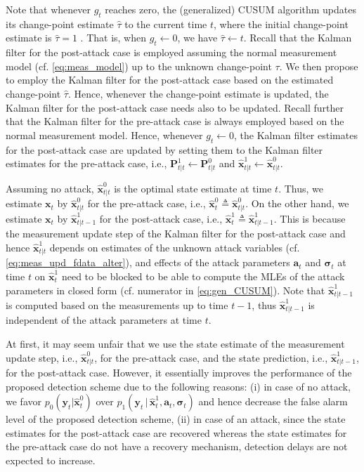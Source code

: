 \documentclass[onecolumn]{IEEEtran}
\begin{document}
Note that whenever $g_t$ reaches zero, the (generalized) CUSUM algorithm updates its change-point estimate $\hat{\tau}$ to the current time $t$, where the initial change-point estimate is $\hat{\tau} = 1$ \cite[Sec. 2.2]{Basseville93}. That is, when $g_t \gets 0$, we have $\hat{\tau} \gets t$. Recall that the Kalman filter for the post-attack case is employed assuming the normal measurement model (cf. \eqref{eq:meas_model}) up to the unknown change-point $\tau$. We then propose to employ the Kalman filter for the post-attack case based on the estimated change-point $\hat{\tau}$. Hence, whenever the change-point estimate is updated, the Kalman filter for the post-attack case needs also to be updated. Recall further that the Kalman filter for the pre-attack case is always employed based on the normal measurement model. Hence, whenever $g_t \gets 0$, the Kalman filter estimates for the post-attack case are updated by setting them to the Kalman filter estimates for the pre-attack case, i.e., $\mathbf{P}_{t|t}^1 \gets \mathbf{P}_{t|t}^0$ and $\hat{\mathbf{x}}_{t|t}^1 \gets \hat{\mathbf{x}}_{t|t}^0$.

Assuming no attack, $\hat{\mathbf{x}}_{t|t}^0$ is the optimal state estimate at time $t$. Thus, we estimate $\mathbf{x}_t$ by $\hat{\mathbf{x}}_{t|t}^0$ for the pre-attack case, i.e., $\hat{\mathbf{x}}_t^0 \triangleq \hat{\mathbf{x}}_{t|t}^0$. On the other hand, we estimate $\mathbf{x}_t$ by $\hat{\mathbf{x}}_{t|t-1}^1$ for the post-attack case, i.e., $\hat{\mathbf{x}}_t^1 \triangleq \hat{\mathbf{x}}_{t|t-1}^1$. This is because the measurement update step of the Kalman filter for the post-attack case and hence $\hat{\mathbf{x}}_{t|t}^1$ depends on estimates of the unknown attack variables (cf. \eqref{eq:meas_upd_fdata_alter}), and effects of the attack parameters $\mathbf{a}_t$ and $\pmb{\sigma}_t$ at time $t$ on $\hat{\mathbf{x}}_t^1$ need to be blocked to be able to compute the MLEs of the attack parameters in closed form (cf. numerator in \eqref{eq:gen_CUSUM}).  Note that $\hat{\mathbf{x}}_{t|t-1}^1$ is computed based on the measurements up to time $t-1$, thus $\hat{\mathbf{x}}_{t|t-1}^1$ is independent of the attack parameters at time $t$.

At first, it may seem unfair that we use the state estimate of the measurement update step, i.e., $\hat{\mathbf{x}}_{t|t}^0$, for the pre-attack case, and the state prediction, i.e., $\hat{\mathbf{x}}_{t|t-1}^1$, for the post-attack case. However, it essentially improves the performance of the proposed detection scheme due to the following reasons: (i) in case of no attack, we favor $p_0(\mathbf{y}_t|\hat{\mathbf{x}}_t^0)$ over $p_1(\mathbf{y}_t \,|\, \hat{\mathbf{x}}_t^1, \mathbf{a}_t, \pmb{\sigma}_t)$ and hence decrease the false alarm level of the proposed detection scheme, (ii) in case of an attack, since the state estimates for the post-attack case are recovered whereas the state estimates for the pre-attack case do not have a recovery mechanism, detection delays are not expected to increase.
\end{document}
